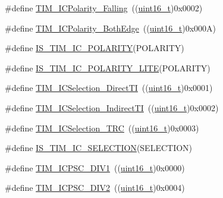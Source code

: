 \begin{DoxyCompactItemize}
\item 
\#define \hyperlink{group___t_i_m___input___capture___polarity_ga70c6f5ed30a236bac4c690928e742243}{T\+I\+M\+\_\+\+I\+C\+Polarity\+\_\+\+Falling}~((\hyperlink{_p_e___types_8h_a1f1825b69244eb3ad2c7165ddc99c956}{uint16\+\_\+t})0x0002)
\item 
\#define \hyperlink{group___t_i_m___input___capture___polarity_ga4632a6425d407c0d28b610b2d31cccc8}{T\+I\+M\+\_\+\+I\+C\+Polarity\+\_\+\+Both\+Edge}~((\hyperlink{_p_e___types_8h_a1f1825b69244eb3ad2c7165ddc99c956}{uint16\+\_\+t})0x000\+A)
\item 
\#define \hyperlink{group___t_i_m___input___capture___polarity_ga6aff2fe442fd9662a0bb8731134cda89}{I\+S\+\_\+\+T\+I\+M\+\_\+\+I\+C\+\_\+\+P\+O\+L\+A\+R\+I\+TY}(P\+O\+L\+A\+R\+I\+TY)
\item 
\#define \hyperlink{group___t_i_m___input___capture___polarity_gaaae722dd6c33a224df267c703824b94c}{I\+S\+\_\+\+T\+I\+M\+\_\+\+I\+C\+\_\+\+P\+O\+L\+A\+R\+I\+T\+Y\+\_\+\+L\+I\+TE}(P\+O\+L\+A\+R\+I\+TY)
\item 
\#define \hyperlink{group___t_i_m___input___capture___selection_ga3d38876044457b7faefe951d367ac8c3}{T\+I\+M\+\_\+\+I\+C\+Selection\+\_\+\+Direct\+TI}~((\hyperlink{_p_e___types_8h_a1f1825b69244eb3ad2c7165ddc99c956}{uint16\+\_\+t})0x0001)
\item 
\#define \hyperlink{group___t_i_m___input___capture___selection_ga2289b684133ac0b81ddfcd860d01b144}{T\+I\+M\+\_\+\+I\+C\+Selection\+\_\+\+Indirect\+TI}~((\hyperlink{_p_e___types_8h_a1f1825b69244eb3ad2c7165ddc99c956}{uint16\+\_\+t})0x0002)
\item 
\#define \hyperlink{group___t_i_m___input___capture___selection_ga2cd464e97ffd6ea3208ec65672f9a373}{T\+I\+M\+\_\+\+I\+C\+Selection\+\_\+\+T\+RC}~((\hyperlink{_p_e___types_8h_a1f1825b69244eb3ad2c7165ddc99c956}{uint16\+\_\+t})0x0003)
\item 
\#define \hyperlink{group___t_i_m___input___capture___selection_ga623d8592109f4702829ae7fc3806bcb8}{I\+S\+\_\+\+T\+I\+M\+\_\+\+I\+C\+\_\+\+S\+E\+L\+E\+C\+T\+I\+ON}(S\+E\+L\+E\+C\+T\+I\+ON)
\item 
\#define \hyperlink{group___t_i_m___input___capture___prescaler_ga8acb44abe3147d883685c1f9f1ce410e}{T\+I\+M\+\_\+\+I\+C\+P\+S\+C\+\_\+\+D\+I\+V1}~((\hyperlink{_p_e___types_8h_a1f1825b69244eb3ad2c7165ddc99c956}{uint16\+\_\+t})0x0000)
\item 
\#define \hyperlink{group___t_i_m___input___capture___prescaler_ga1d8a7b66add914e2ddd910d2d700978f}{T\+I\+M\+\_\+\+I\+C\+P\+S\+C\+\_\+\+D\+I\+V2}~((\hyperlink{_p_e___types_8h_a1f1825b69244eb3ad2c7165ddc99c956}{uint16\+\_\+t})0x0004)

\end{DoxyCompactItemize}
